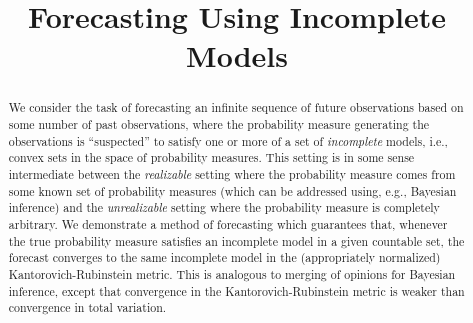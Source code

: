 \documentclass[aop,preprint]{imsart}
\numberwithin{equation}{section}
\theoremstyle{definition}
\theoremstyle{plain}
\begin{document}
\begin{frontmatter}

\title{Forecasting Using Incomplete Models}

\begin{aug}
\author{ }

\address{
}

\end{aug}

\renewcommand{\abstractname}{}
\begin{abstract}
We consider the task of forecasting an infinite sequence of future observations based on some number of past observations, where the probability measure generating the observations is \enquote{suspected} to satisfy one or more of a set of \emph{incomplete} models, i.e., convex sets in the space of probability measures. This setting is in some sense intermediate between the \emph{realizable} setting where the probability measure comes from some known set of probability measures (which can be addressed using, e.g., Bayesian inference) and the \emph{unrealizable} setting where the probability measure is completely arbitrary. We demonstrate a method of forecasting which guarantees that, whenever the true probability measure satisfies an incomplete model in a given countable set, the forecast converges to the same incomplete model in the (appropriately normalized) Kantorovich-Rubinstein metric. This is analogous to merging of opinions for Bayesian inference, except that convergence in the Kantorovich-Rubinstein metric is weaker than convergence in total variation.
\end{abstract}

\begin{keyword}[class=MSC]
\end{keyword}

\begin{keyword}
\end{keyword}

\end{frontmatter}
\end{document}
